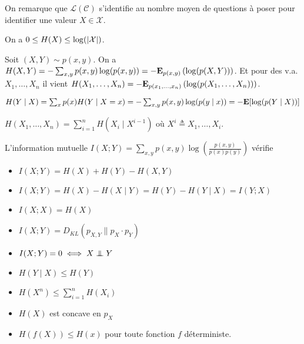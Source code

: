 On remarque que $\mathcal{L}(\mathcal{C})$ s'identifie au nombre moyen de questions à poser pour identifier une valeur $X \in \mathcal{X}$.

\begin{defn}
	[...]
\end{defn}

\begin{thm}
	On a $0 \leq H(X) \leq \log( \left\lvert\mathcal{X}\right\rvert )$.
\end{thm}

\begin{defn}
	Soit $(X,Y) \sim p(x,y)$.
	On a $H(X,Y) = - \sum_{x,y} p(x,y) \log(p(x,y)) = - \mathbf{E}_{p(x,y)} \left( \log (p(X,Y)) \right)$.
	Et pour des v.a. $X_1, \ldots, X_n$ il vient $H(X_1,\ldots,X_n) = - \mathbf{E}_{p(x_1,\ldots,x_n)} \left( \log( p(X_1,\ldots,X_n)) \right)$.
\end{defn}

\begin{defn}
	$H(Y \mid X)
		= \sum_x p(x) H(Y \mid X = x)
		= - \sum_{x,y} p(x,y) \log(p(y \mid x))
		= - \mathbf{E} [ \log(p(Y \mid X)) ]$
\end{defn}

\begin{thm}
	$H(X_1,\ldots,X_n) = \sum_{i = 1}^n H(X_i \mid X^{i - 1})$ où $X^i \triangleq X_1,\ldots,X_i$.
\end{thm}

\begin{pop}
	L'information mutuelle $I(X;Y) = \sum_{x,y} p(x,y) \log \left( \frac{p(x,y)}{p(x)p(y)} \right)$ vérifie
	\begin{itemize}
		\item[\textbullet] $I(X;Y) = H(X) + H(Y) - H(X,Y)$
		\item[\textbullet] $I(X;Y) = H(X) - H(X \mid Y) = H(Y) - H(Y \mid X) = I(Y;X)$
		\item[\textbullet] $I(X;X) = H(X)$
		\item[\textbullet] $I(X;Y) = D_{KL}( p_{X,Y} \| p_X \cdot p_Y )$
		\item[\textbullet] $I(X;Y) = 0 \iff X \indep Y$
		\item[\textbullet] $H(Y \mid X) \leq H(Y)$
		\item[\textbullet] $H(X^n) \leq \sum_{i = 1}^n H(X_i)$
		\item[\textbullet] $H(X)$ est concave en $p_X$
		\item[\textbullet] $H(f(X)) \leq H(x)$ pour toute fonction $f$ déterministe.
	\end{itemize}
\end{pop}

